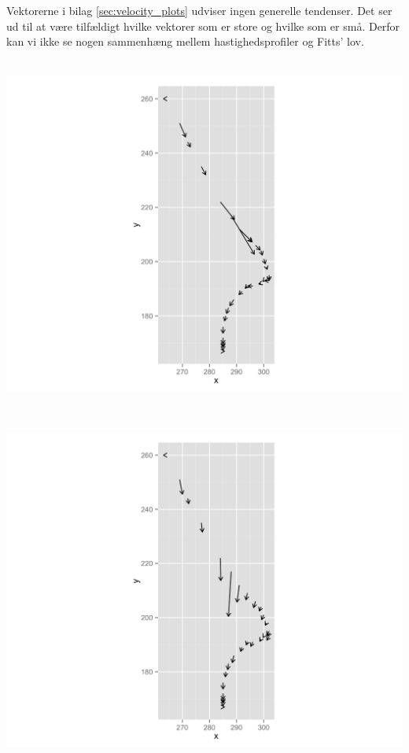 Vektorerne i bilag \ref{sec:velocity_plots} udviser ingen generelle tendenser. Det ser ud til at være tilfældigt hvilke vektorer som er store og hvilke som er små. Derfor kan vi ikke se nogen sammenhæng mellem hastighedsprofiler og Fitts' lov.\\\\
\begin{minipage}{\linewidth}
	\begin{minipage}{.45\linewidth}
		\includegraphics[width=\linewidth, trim = 20cm 0cm 20cm 0cm, clip]{images/plots/plot_velocity_individual}
		\label{fig:plot_velocity_individual}
	\end{minipage}
	\begin{minipage}[b]{0.1\linewidth}
	~
	\end{minipage}
	\begin{minipage}{.45\linewidth}
		\includegraphics[width=\linewidth, trim = 20cm 0cm 20cm 0cm, clip]{images/plots/plot_velocity_individual_target}
		\label{fig:plot_velocity_individual_target}
	\end{minipage}
\end{minipage}


